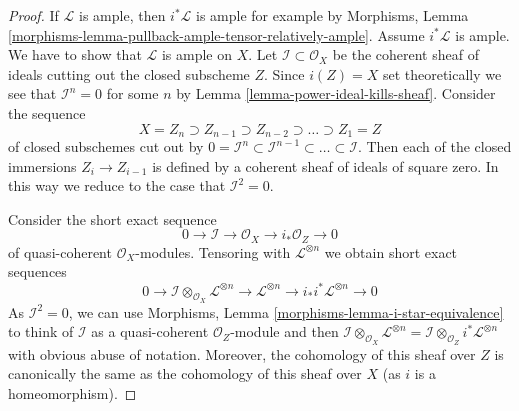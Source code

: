 \begin{proof}
If $\mathcal{L}$ is ample, then $i^*\mathcal{L}$ is ample for
example by Morphisms, Lemma
\ref{morphisms-lemma-pullback-ample-tensor-relatively-ample}.
Assume $i^*\mathcal{L}$ is ample. We have to show that $\mathcal{L}$
is ample on $X$.
Let $\mathcal{I} \subset \mathcal{O}_X$ be the coherent sheaf of ideals
cutting out the closed subscheme $Z$. Since $i(Z) = X$ set theoretically
we see that $\mathcal{I}^n = 0$ for some $n$ by
Lemma \ref{lemma-power-ideal-kills-sheaf}.
Consider the sequence
$$
X = Z_n \supset Z_{n - 1} \supset Z_{n - 2} \supset \ldots \supset Z_1 = Z
$$
of closed subschemes cut out by
$0 = \mathcal{I}^n \subset \mathcal{I}^{n - 1} \subset \ldots \subset
\mathcal{I}$. Then each of the closed immersions $Z_i \to Z_{i - 1}$
is defined by a coherent sheaf of ideals of square zero. In this way
we reduce to the case that $\mathcal{I}^2 = 0$.

\medskip\noindent
Consider the short exact sequence
$$
0 \to \mathcal{I} \to \mathcal{O}_X \to i_*\mathcal{O}_Z \to 0
$$
of quasi-coherent $\mathcal{O}_X$-modules. Tensoring with
$\mathcal{L}^{\otimes n}$ we obtain short exact sequences
\begin{equation}
\label{equation-ses}
0 \to \mathcal{I} \otimes_{\mathcal{O}_X} \mathcal{L}^{\otimes n}
\to \mathcal{L}^{\otimes n} \to i_*i^*\mathcal{L}^{\otimes n} \to 0
\end{equation}
As $\mathcal{I}^2 = 0$, we can use
Morphisms, Lemma \ref{morphisms-lemma-i-star-equivalence}
to think of $\mathcal{I}$ as a quasi-coherent $\mathcal{O}_Z$-module
and then $\mathcal{I} \otimes_{\mathcal{O}_X} \mathcal{L}^{\otimes n} =
\mathcal{I} \otimes_{\mathcal{O}_Z} i^*\mathcal{L}^{\otimes n}$ with
obvious abuse of notation.
Moreover, the cohomology of this sheaf over $Z$ is canonically
the same as the cohomology of this sheaf over $X$ (as $i$ is a
homeomorphism).


\end{proof}
